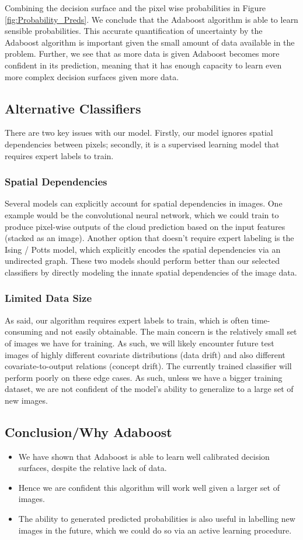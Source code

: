 \documentclass[11pt, letterpaper, journal]{IEEEtran}
\begin{document}
Combining the decision surface and the pixel wise probabilities in Figure \ref{fig:Probability_Preds}. We conclude that the Adaboost algorithm is able to learn sensible probabilities. This accurate quantification of uncertainty by the Adaboost algorithm is important given the small amount of data available in the problem. Further, we see that as more data is given Adaboost becomes more confident in its prediction, meaning that it has enough capacity to learn even more complex decision surfaces given more data. 


\subsection{Alternative Classifiers}
There are two key issues with our model. Firstly, our model ignores spatial dependencies between pixels; secondly, it is a supervised learning model that requires expert labels to train.
\subsubsection{Spatial Dependencies}
Several models can explicitly account for spatial dependencies in images. One example would be the convolutional neural network, which we could train to produce pixel-wise outputs of the cloud prediction based on the input features (stacked as an image). Another option that doesn't require expert labeling is the Ising / Potts model, which explicitly encodes the spatial dependencies via an undirected graph. These two models should perform better than our selected classifiers by directly modeling the innate spatial dependencies of the image data.
\subsubsection{Limited Data Size}
As said, our algorithm requires expert labels to train, which is often time-consuming and not easily obtainable. The main concern is the relatively small set of images we have for training. As such, we will likely encounter future test images of highly different covariate distributions (data drift) and also different covariate-to-output relations (concept drift). The currently trained classifier will perform poorly on these edge cases. As such, unless we have a bigger training dataset, we are not confident of the model's ability to generalize to a large set of new images. 

\subsection{Conclusion/Why Adaboost}
\begin{itemize}
    \item We have shown that Adaboost is able to learn well calibrated decision surfaces, despite the relative lack of data.
    \item Hence we are confident this algorithm will work well given a larger set of images.
    \item The ability to generated predicted probabilities is also useful in labelling new images in the future, which we could do so via an active learning procedure.
\end{itemize}
\end{document}
